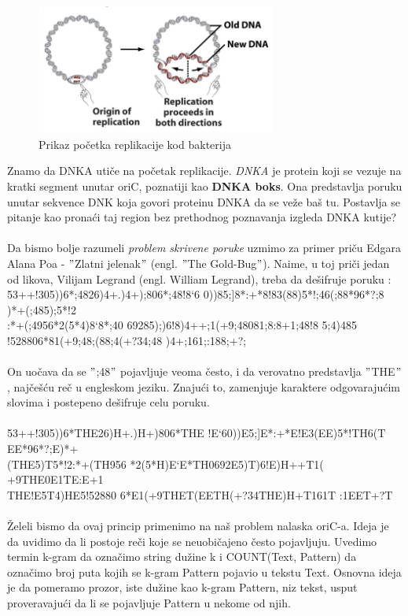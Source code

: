 \begin{figure}[h]
\caption{Prikaz početka replikacije kod bakterija}
\centering
\includegraphics[width=0.7\textwidth]{poglavlja/1/slike/Replikacija_bakterija.png}
\end{figure} 

Znamo da DNKA utiče na početak replikacije. \textit{DNKA} je protein koji se vezuje na kratki segment unutar oriC, poznatiji kao \textbf{DNKA boks}. Ona predstavlja poruku unutar sekvence DNK koja govori proteinu DNKA da se veže baš tu. Postavlja se pitanje kao pronaći taj region bez prethodnog poznavanja izgleda DNKA kutije? \\\\

Da bismo bolje razumeli \textit{problem skrivene poruke} uzmimo za primer priču Edgara Alana Poa - $"$Zlatni jelenak$"$ (engl. $"$The Gold-Bug$"$).
Naime, u toj priči jedan od likova, Vilijam Legrand (engl. William Legrand), treba da dešifruje poruku :\\

53++!305))6*;4826)4+.)4+);806*;48!8`6
0))85;]8*:+*8!83(88)5*!;46(;88*96*?;8
)*+(;485);5*!2\\:*+(;4956*2(5*4)8`8*;40
69285);)6!8)4++;1(+9;48081;8:8+1;48!8
5;4)485\\!528806*81(+9;48;(88;4(+?34;48
)4+;161;:188;+?;\\\\
On uočava da se $"$;48$"$ pojavljuje veoma često, i da verovatno predstavlja $"$THE$"$, najčešću reč u engleskom jeziku. Znajući to, zamenjuje karaktere odgovarajućim slovima i postepeno dešifruje celu poruku.\\\\
53++!305))6*THE26)H+.)H+)806*THE
!E`60))E5;]E*:+*E!E3(EE)5*!TH6(T
EE*96*?;E)*+\\(THE5)T5*!2:*+(TH956
*2(5*H)E`E*TH0692E5)T)6!E)H++T1(
+9THE0E1TE:E+1\\THE!E5T4)HE5!52880
6*E1(+9THET(EETH(+?34THE)H+T161T
:1EET+?T\\\\
Želeli bismo da ovaj princip primenimo na naš problem nalaska oriC-a. Ideja je da uvidimo da li postoje reči koje se neuobičajeno često pojavljuju. Uvedimo termin k-gram da označimo string dužine k i COUNT(Text, Pattern) da označimo broj puta kojih se k-gram Pattern pojavio u tekstu Text. Osnovna ideja je da pomeramo prozor, iste dužine kao k-gram Pattern, niz tekst, usput proveravajući da li se pojavljuje Pattern u nekome od njih. 

